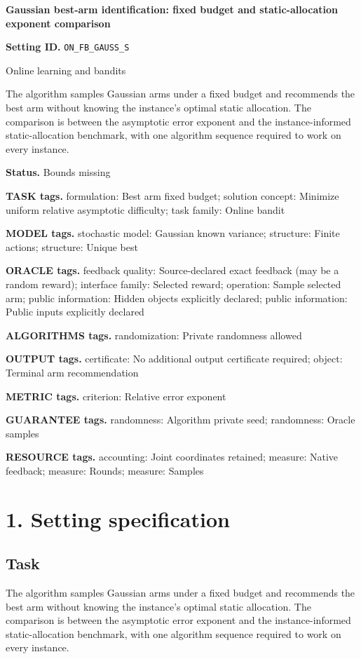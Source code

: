 \documentclass[10pt,a4paper]{article}
\begin{document}
\raggedright

{\LARGE\bfseries\sffamily\color{AtlasNavy} Gaussian best-arm identification: fixed budget and static-allocation exponent comparison\par}\vspace{5pt}
\textbf{Setting ID.} \texttt{ON\_\allowbreak{}FB\_\allowbreak{}GAUSS\_\allowbreak{}S}

Online learning and bandits

The algorithm samples Gaussian arms under a fixed budget and recommends the best arm without knowing the instance's optimal static allocation. The comparison is between the asymptotic error exponent and the instance-informed static-allocation benchmark, with one algorithm sequence required to work on every instance.

\textbf{Status.} Bounds missing

\textbf{TASK tags.} formulation: Best arm fixed budget; solution concept: Minimize uniform relative asymptotic difficulty; task family: Online bandit

\textbf{MODEL tags.} stochastic model: Gaussian known variance; structure: Finite actions; structure: Unique best

\textbf{ORACLE tags.} feedback quality: Source-declared exact feedback (may be a random reward); interface family: Selected reward; operation: Sample selected arm; public information: Hidden objects explicitly declared; public information: Public inputs explicitly declared

\textbf{ALGORITHMS tags.} randomization: Private randomness allowed

\textbf{OUTPUT tags.} certificate: No additional output certificate required; object: Terminal arm recommendation

\textbf{METRIC tags.} criterion: Relative error exponent

\textbf{GUARANTEE tags.} randomness: Algorithm private seed; randomness: Oracle samples

\textbf{RESOURCE tags.} accounting: Joint coordinates retained; measure: Native feedback; measure: Rounds; measure: Samples

\section{1. Setting specification}
\subsection{Task}
The algorithm samples Gaussian arms under a fixed budget and recommends the best arm without knowing the instance's optimal static allocation. The comparison is between the asymptotic error exponent and the instance-informed static-allocation benchmark, with one algorithm sequence required to work on every instance.
\end{document}
